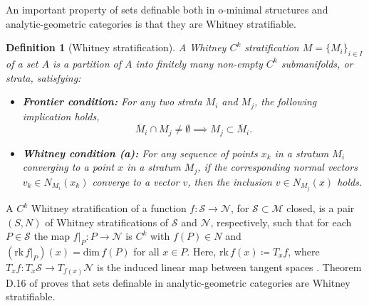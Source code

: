 \documentclass{article}
\newtheorem{definition}{Definition}
\newtheorem{theorem}{Theorem}
\newcommand{\CM}{\mathcal{M}}
\begin{document}
An important property of sets definable both in o-minimal structures and analytic-geometric categories is that they are Whitney stratifiable. 
\begin{definition}[Whitney stratification]
	A Whitney $C^k$ stratification $M=\{M_i\}_{i\in I}$ of a set $A$ is a partition of $A$ into finitely many non-empty $C^k$ submanifolds, or strata, satisfying:
	\begin{itemize}
	    \item \textbf{Frontier condition:} For any two strata $M_i$ and $M_j$, the following implication holds,
	    \begin{equation}
	        \overline{M}_i\cap M_j\neq \emptyset
	        \implies M_j\subset \overline{M}_i.
	    \end{equation}
	    
	    \item \textbf{Whitney condition (a):} For any sequence of points $x_k$ in a stratum $M_i$ converging to a point $x$ in a stratum $M_j$, if the corresponding normal vectors $v_k\in N_{M_i}(x_k)$ converge to a vector $v$, then the inclusion $v\in N_{M_j}(x)$ holds.
	\end{itemize}
	\end{definition}
A $C^k$ Whitney stratification of a function $f: \mathcal{S}\to\mathcal{N}$, for $\mathcal{S}\subset \CM$ closed, is a pair $(S,N)$ of Whitney stratifications of $\mathcal{S}$ and $\mathcal{N}$, respectively, such that for each $P\in\mathcal{S}$ the map $f|_P: P\to \mathcal{N}$ is $C^k$ with $f(P)\in N$ and $(\text{rk}\, f|_P)(x)=\text{dim}\, f(P)$ for all $x\in P$. Here, $\text{rk}\,f(x)\coloneqq T_xf$, where $T_xf:T_x\mathcal{S}\to T_{f(x)}\mathcal{N}$ is the induced linear map between tangent spaces \cite{Dries1996GeometricCA}. Theorem D.16 of \cite{Dries1996GeometricCA} proves that sets definable in analytic-geometric categories are Whitney stratifiable. 


\end{document}
